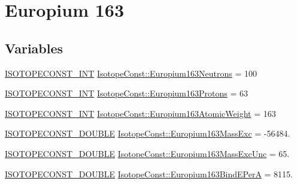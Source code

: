 \hypertarget{group___isotope_const-_europium-_eu163}{}\section{Europium 163}
\label{group___isotope_const-_europium-_eu163}
\subsection*{Variables}
\begin{DoxyCompactItemize}
\item 
\mbox{\hyperlink{group___isotope_const-_macros_ga5f18360b3e99483a35c32d789e62621c}{I\+S\+O\+T\+O\+P\+E\+C\+O\+N\+S\+T\+\_\+\+I\+NT}} \mbox{\hyperlink{group___isotope_const-_europium-_eu163_ga6e3cd88b04f7fb16af1be230095a61fb}{Isotope\+Const\+::\+Europium163\+Neutrons}} = 100
\item 
\mbox{\hyperlink{group___isotope_const-_macros_ga5f18360b3e99483a35c32d789e62621c}{I\+S\+O\+T\+O\+P\+E\+C\+O\+N\+S\+T\+\_\+\+I\+NT}} \mbox{\hyperlink{group___isotope_const-_europium-_eu163_gaa8bb574b08daf2019adbdeabf8c0dcf3}{Isotope\+Const\+::\+Europium163\+Protons}} = 63
\item 
\mbox{\hyperlink{group___isotope_const-_macros_ga5f18360b3e99483a35c32d789e62621c}{I\+S\+O\+T\+O\+P\+E\+C\+O\+N\+S\+T\+\_\+\+I\+NT}} \mbox{\hyperlink{group___isotope_const-_europium-_eu163_gab5c283fc4a7bb5b4b759fc3492c9827c}{Isotope\+Const\+::\+Europium163\+Atomic\+Weight}} = 163
\item 
\mbox{\hyperlink{group___isotope_const-_macros_ga8f45a7272ce02c0b4c65c44636ed719a}{I\+S\+O\+T\+O\+P\+E\+C\+O\+N\+S\+T\+\_\+\+D\+O\+U\+B\+LE}} \mbox{\hyperlink{group___isotope_const-_europium-_eu163_ga60667f81ad41e4ba953f4bc5c3a35f8c}{Isotope\+Const\+::\+Europium163\+Mass\+Exc}} = -\/56484.
\item 
\mbox{\hyperlink{group___isotope_const-_macros_ga8f45a7272ce02c0b4c65c44636ed719a}{I\+S\+O\+T\+O\+P\+E\+C\+O\+N\+S\+T\+\_\+\+D\+O\+U\+B\+LE}} \mbox{\hyperlink{group___isotope_const-_europium-_eu163_ga708b5f1d45a84121e6561bd4315160dd}{Isotope\+Const\+::\+Europium163\+Mass\+Exc\+Unc}} = 65.
\item 
\mbox{\hyperlink{group___isotope_const-_macros_ga8f45a7272ce02c0b4c65c44636ed719a}{I\+S\+O\+T\+O\+P\+E\+C\+O\+N\+S\+T\+\_\+\+D\+O\+U\+B\+LE}} \mbox{\hyperlink{group___isotope_const-_europium-_eu163_ga3c030d0b8918e973fbfb79d4c073a59b}{Isotope\+Const\+::\+Europium163\+Bind\+E\+PerA}} = 8115.
\item 

\end{DoxyCompactItemize}
